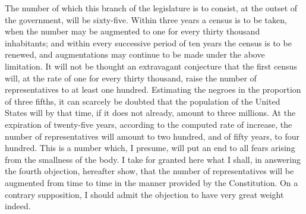 The number of which this branch of the legislature is to consist, at the outset of the government, will be sixty-five. Within three years a census is to be taken, when the number may be augmented to one for every thirty thousand inhabitants; and within every successive period of ten years the census is to be renewed, and augmentations may continue to be made under the above limitation. It will not be thought an extravagant conjecture that the first census will, at the rate of one for every thirty thousand, raise the number of representatives to at least one hundred. Estimating the negroes in the proportion of three fifths, it can scarcely be doubted that the population of the United States will by that time, if it does not already, amount to three millions. At the expiration of twenty-five years, according to the computed rate of increase, the number of representatives will amount to two hundred, and of fifty years, to four hundred. This is a number which, I presume, will put an end to all fears arising from the smallness of the body. I take for granted here what I shall, in answering the fourth objection, hereafter show, that the number of representatives will be augmented from time to time in the manner provided by the Constitution. On a contrary supposition, I should admit the objection to have very great weight indeed.

